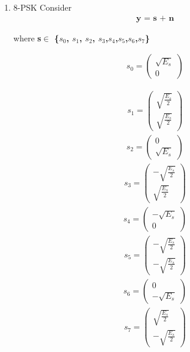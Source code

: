 \begin{enumerate}[label=\thesubsection.\arabic*.,ref=\thesubsection.\theenumi]



\item 
8-PSK 
Consider
\begin{align}
\textbf{y = s + n}
\end{align}

where \textbf{ s$\in$ \{$s_0$, $s_1$, $s_2$, $s_3$,$s_4$,$s_5$,$s_6$,$s_7$\}}

\begin{align}
    s_0 = 
    \begin{pmatrix}
     \sqrt{E_s} \\
     0
    \end{pmatrix}
\end{align}

\begin{align}
    s_1 = 
    \begin{pmatrix}
     \sqrt{\frac{E_s}{2}}\\
     \sqrt{\frac{E_s}{2}}
    \end{pmatrix}
\end{align}
\begin{align}
    s_2 = 
    \begin{pmatrix}
      0 \\
     \sqrt{E_s}
    \end{pmatrix}
\end{align}
\begin{align}
    s_3 = 
    \begin{pmatrix}
     -\sqrt{\frac{E_s}{2}}\\
     \sqrt{\frac{E_s}{2}}
    \end{pmatrix}
\end{align}
\begin{align}
    s_4 = 
    \begin{pmatrix}
     -\sqrt{E_s} \\
     0
    \end{pmatrix}
\end{align}
\begin{align}
    s_5 = 
    \begin{pmatrix}
     -\sqrt{\frac{E_s}{2}}\\
     -\sqrt{\frac{E_s}{2}}
    \end{pmatrix}
\end{align}
\begin{align}
    s_6 = 
    \begin{pmatrix}
     0\\
     -\sqrt{E_s}
    \end{pmatrix}
\end{align}
\begin{align}
    s_7 = 
    \begin{pmatrix}
     \sqrt{\frac{E_s}{2}}\\
     -\sqrt{\frac{E_s}{2}}
    \end{pmatrix}
\end{align}


\end{enumerate}
